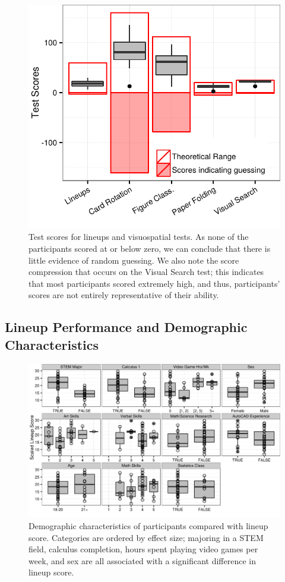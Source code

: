 \documentclass[11pt]{isuthesis}\usepackage[]{graphicx}\usepackage[]{color}
\begin{document}
\begin{figure}[ht]\centering
\includegraphics[width=.6\linewidth]{fig-ResultsScaledScores-1}
\caption[Test scores for lineups and visuospatial tests]{Test scores for lineups and visuospatial tests. As none of the participants scored at or below zero, we can conclude that there is little evidence of random guessing. We also note the score compression that occurs on the Visual Search test; this indicates that most participants scored extremely high, and thus, participants' scores are not entirely representative of their ability. \label{fig:Scores}}
\end{figure}
% 



\subsection{Lineup Performance and Demographic Characteristics}


\begin{figure}[h!tb]\centering
\includegraphics[width=.85\linewidth]{fig-VisReasoningCategorical-1}
\caption[Visual Aptitude Study Results]{Demographic characteristics of participants compared with lineup score. Categories are ordered by effect size; majoring in a STEM field, calculus completion, hours spent playing video games per week, and sex are all associated with a significant difference in lineup score. }\label{fig:visualaptitudecat}
\end{figure}
\end{document}
